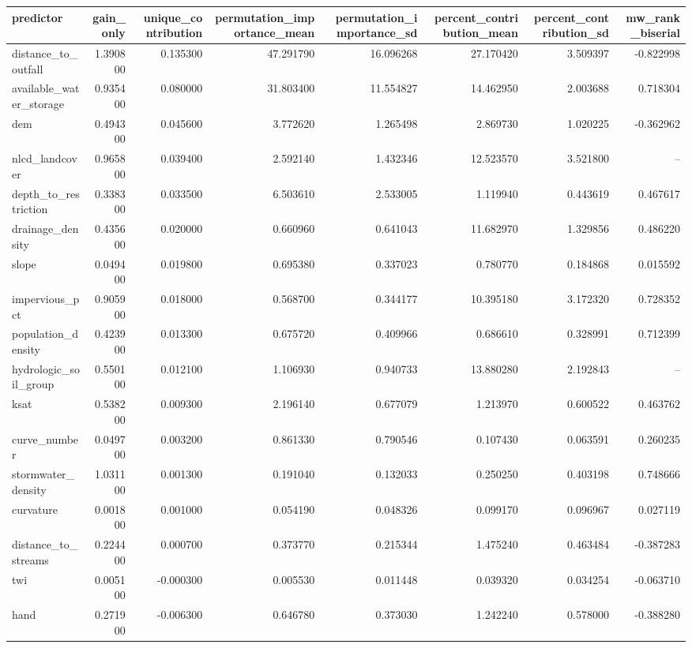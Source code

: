 \begin{tabular}{lrrrrrrr}
\toprule
predictor & gain\_only & unique\_contribution & permutation\_importance\_mean & permutation\_importance\_sd & percent\_contribution\_mean & percent\_contribution\_sd & mw\_rank\_biserial \\
\midrule
distance\_to\_outfall & 1.390800 & 0.135300 & 47.291790 & 16.096268 & 27.170420 & 3.509397 & -0.822998 \\
available\_water\_storage & 0.935400 & 0.080000 & 31.803400 & 11.554827 & 14.462950 & 2.003688 & 0.718304 \\
dem & 0.494300 & 0.045600 & 3.772620 & 1.265498 & 2.869730 & 1.020225 & -0.362962 \\
nlcd\_landcover & 0.965800 & 0.039400 & 2.592140 & 1.432346 & 12.523570 & 3.521800 & -- \\
depth\_to\_restriction & 0.338300 & 0.033500 & 6.503610 & 2.533005 & 1.119940 & 0.443619 & 0.467617 \\
drainage\_density & 0.435600 & 0.020000 & 0.660960 & 0.641043 & 11.682970 & 1.329856 & 0.486220 \\
slope & 0.049400 & 0.019800 & 0.695380 & 0.337023 & 0.780770 & 0.184868 & 0.015592 \\
impervious\_pct & 0.905900 & 0.018000 & 0.568700 & 0.344177 & 10.395180 & 3.172320 & 0.728352 \\
population\_density & 0.423900 & 0.013300 & 0.675720 & 0.409966 & 0.686610 & 0.328991 & 0.712399 \\
hydrologic\_soil\_group & 0.550100 & 0.012100 & 1.106930 & 0.940733 & 13.880280 & 2.192843 & -- \\
ksat & 0.538200 & 0.009300 & 2.196140 & 0.677079 & 1.213970 & 0.600522 & 0.463762 \\
curve\_number & 0.049700 & 0.003200 & 0.861330 & 0.790546 & 0.107430 & 0.063591 & 0.260235 \\
stormwater\_density & 1.031100 & 0.001300 & 0.191040 & 0.132033 & 0.250250 & 0.403198 & 0.748666 \\
curvature & 0.001800 & 0.001000 & 0.054190 & 0.048326 & 0.099170 & 0.096967 & 0.027119 \\
distance\_to\_streams & 0.224400 & 0.000700 & 0.373770 & 0.215344 & 1.475240 & 0.463484 & -0.387283 \\
twi & 0.005100 & -0.000300 & 0.005530 & 0.011448 & 0.039320 & 0.034254 & -0.063710 \\
hand & 0.271900 & -0.006300 & 0.646780 & 0.373030 & 1.242240 & 0.578000 & -0.388280 \\
\bottomrule
\end{tabular}
